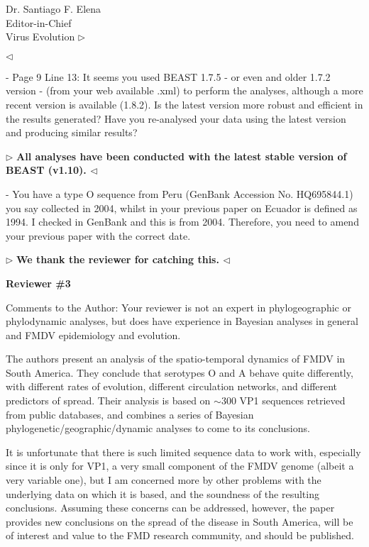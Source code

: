 \documentclass[12pt, a4paper]{letter} %
\newenvironment{reply}{$\triangleright$\bf}{$\triangleleft$}
\begin{document}
\begin{letter}{
	Dr. Santiago F. Elena\\
    Editor-in-Chief \\
    Virus Evolution
}
\begin{reply}

\end{reply}

-       Page 9 Line 13: It seems you used BEAST 1.7.5 - or even and older 1.7.2 version - (from your web available .xml) to perform the analyses, although a more recent version is available (1.8.2). 
Is the latest version more robust and efficient in the results generated? 
Have you re-analysed your data using the latest version and producing similar results?

\begin{reply}
All analyses have been conducted with the latest stable version of BEAST (v1.10). 
\end{reply}

-       You have a type O sequence from Peru (GenBank Accession No. HQ695844.1) you say collected in 2004, whilst in your previous paper on Ecuador is defined as 1994. 
I checked in GenBank and this is from 2004. 
Therefore, you need to amend your previous paper with the correct date.

\begin{reply}
We thank the reviewer for catching this.
\end{reply}

\textbf{Reviewer \#3}

Comments to the Author: Your reviewer is not an expert in phylogeographic or phylodynamic analyses, but does have experience in Bayesian analyses in general and FMDV epidemiology and evolution.

The authors present an analysis of the spatio-temporal dynamics of FMDV in South America. 
They conclude that serotypes O and A behave quite differently, with different rates of evolution, different circulation networks, and different predictors of spread. 
Their analysis is based on $\sim$300 VP1 sequences retrieved from public databases, and combines a series of Bayesian phylogenetic/geographic/dynamic analyses to come to its conclusions.

It is unfortunate that there is such limited sequence data to work with, especially since it is only for VP1, a very small component of the FMDV genome (albeit a very variable one), but I am concerned more by other problems with the underlying data on which it is based, and the soundness of the resulting conclusions. 
Assuming these concerns can be addressed, however, the paper provides new conclusions on the spread of the disease in South America, will be of interest and value to the FMD research community, and should be published.


\end{letter}
\end{document}
